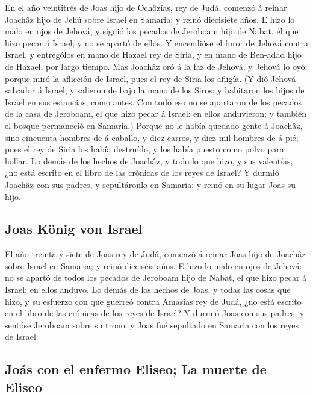 En el año veintitrés de Joas hijo de Ochôzías, rey de
Judá, comenzó á reinar Joachâz hijo de Jehú sobre Israel en Samaria; y
reinó diecisiete años.  E hizo lo malo en ojos de Jehová,
y siguió los pecados de Jeroboam hijo de Nabat, el que hizo pecar á
Israel; y no se apartó de ellos.  Y encendióse el furor de
Jehová contra Israel, y entrególos en mano de Hazael rey de Siria, y en
mano de Ben-adad hijo de Hazael, por largo tiempo.  Mas
Joachâz oró á la faz de Jehová, y Jehová lo oyó: porque miró la
aflicción de Israel, pues el rey de Siria los afligía.  (Y
dió Jehová salvador á Israel, y salieron de bajo la mano de los Siros; y
habitaron los hijos de Israel en sus estancias, como antes.
 Con todo eso no se apartaron de los pecados de la casa de
Jeroboam, el que hizo pecar á Israel: en ellos anduvieron; y también el
bosque permaneció en Samaria.)  Porque no le había quedado
gente á Joachâz, sino cincuenta hombres de á caballo, y diez carros, y
diez mil hombres de á pié; pues el rey de Siria los había destruído, y
los había puesto como polvo para hollar.  Lo demás de los
hechos de Joachâz, y todo lo que hizo, y sus valentías, ¿no está escrito
en el libro de las crónicas de los reyes de Israel?  Y
durmió Joachâz con sus padres, y sepultáronlo en Samaria: y reinó en su
lugar Joas su hijo.

\hypertarget{joas-kuxf6nig-von-israel}{%
\subsection{Joas König von Israel}\label{joas-kuxf6nig-von-israel}}

 El año treinta y siete de Joas rey de Judá, comenzó á
reinar Joas hijo de Joachâz sobre Israel en Samaria; y reinó dieciséis
años.  E hizo lo malo en ojos de Jehová: no se apartó de
todos los pecados de Jeroboam hijo de Nabat, el que hizo pecar á Israel;
en ellos anduvo.  Lo demás de los hechos de Joas, y todas
las cosas que hizo, y su esfuerzo con que guerreó contra Amasías rey de
Judá, ¿no está escrito en el libro de las crónicas de los reyes de
Israel?  Y durmió Joas con sus padres, y sentóse Jeroboam
sobre su trono: y Joas fué sepultado en Samaria con los reyes de Israel.

\hypertarget{jouxe1s-con-el-enfermo-eliseo-la-muerte-de-eliseo}{%
\subsection{Joás con el enfermo Eliseo; La muerte de
Eliseo}\label{jouxe1s-con-el-enfermo-eliseo-la-muerte-de-eliseo}}

